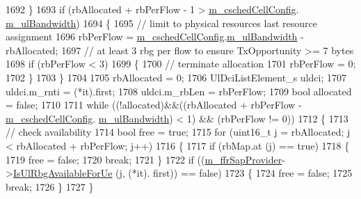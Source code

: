 \begin{DoxyCode}
1692         \}
1693       \textcolor{keywordflow}{if} (rbAllocated + rbPerFlow - 1 > \hyperlink{classns3_1_1PfFfMacScheduler_a0be1f7a1e78824b031e48208b8af1048}{m\_cschedCellConfig}.
      \hyperlink{structns3_1_1FfMacCschedSapProvider_1_1CschedCellConfigReqParameters_a5ab5b102878e6e7e7727a14af4a64d2f}{m\_ulBandwidth})
1694         \{
1695           \textcolor{comment}{// limit to physical resources last resource assignment}
1696           rbPerFlow = \hyperlink{classns3_1_1PfFfMacScheduler_a0be1f7a1e78824b031e48208b8af1048}{m\_cschedCellConfig}.\hyperlink{structns3_1_1FfMacCschedSapProvider_1_1CschedCellConfigReqParameters_a5ab5b102878e6e7e7727a14af4a64d2f}{m\_ulBandwidth} - rbAllocated;
1697           \textcolor{comment}{// at least 3 rbg per flow to ensure TxOpportunity >= 7 bytes}
1698           \textcolor{keywordflow}{if} (rbPerFlow < 3)
1699             \{
1700               \textcolor{comment}{// terminate allocation}
1701               rbPerFlow = 0;
1702             \}
1703         \}
1704 
1705       rbAllocated = 0;
1706       UlDciListElement\_s uldci;
1707       uldci.m\_rnti = (*it).first;
1708       uldci.m\_rbLen = rbPerFlow;
1709       \textcolor{keywordtype}{bool} allocated = \textcolor{keyword}{false};
1710 
1711       \textcolor{keywordflow}{while} ((!allocated)&&((rbAllocated + rbPerFlow - \hyperlink{classns3_1_1PfFfMacScheduler_a0be1f7a1e78824b031e48208b8af1048}{m\_cschedCellConfig}.
      \hyperlink{structns3_1_1FfMacCschedSapProvider_1_1CschedCellConfigReqParameters_a5ab5b102878e6e7e7727a14af4a64d2f}{m\_ulBandwidth}) < 1) && (rbPerFlow != 0))
1712         \{
1713           \textcolor{comment}{// check availability}
1714           \textcolor{keywordtype}{bool} free = \textcolor{keyword}{true};
1715           \textcolor{keywordflow}{for} (uint16\_t j = rbAllocated; j < rbAllocated + rbPerFlow; j++)
1716             \{
1717               \textcolor{keywordflow}{if} (rbMap.at (j) == \textcolor{keyword}{true})
1718                 \{
1719                   free = \textcolor{keyword}{false};
1720                   \textcolor{keywordflow}{break};
1721                 \}
1722               \textcolor{keywordflow}{if} ((\hyperlink{classns3_1_1PfFfMacScheduler_a40519746bd3f39a4b664db3036f2e3fd}{m\_ffrSapProvider}->\hyperlink{classns3_1_1LteFfrSapProvider_a3ef80840549b8ea3d50d2cef8a9866e2}{IsUlRbgAvailableForUe} (j, (*it).
      first)) == \textcolor{keyword}{false})
1723                 \{
1724                   free = \textcolor{keyword}{false};
1725                   \textcolor{keywordflow}{break};
1726                 \}
1727             \}

\end{DoxyCode}
